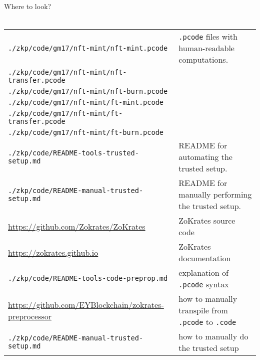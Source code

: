 \begin{center}
  \begin{mdframed}[backgroundcolor=verylightblue]
    Where to look?\\
    \\
    \begin{tabular}{lp{14cm}}
      \texttt{./zkp/code/gm17/nft-mint/nft-mint.pcode} & \texttt{.pcode} files with human-readable computations.\\
      \texttt{./zkp/code/gm17/nft-mint/nft-transfer.pcode} & \\
      \texttt{./zkp/code/gm17/nft-mint/nft-burn.pcode} & \\
      \texttt{./zkp/code/gm17/nft-mint/ft-mint.pcode} & \\
      \texttt{./zkp/code/gm17/nft-mint/ft-transfer.pcode} & \\
      \texttt{./zkp/code/gm17/nft-mint/ft-burn.pcode} & \\
      \texttt{./zkp/code/README-tools-trusted-setup.md} & README for automating the trusted setup.\\
      \texttt{./zkp/code/README-manual-trusted-setup.md} & README for manually performing the trusted setup.\\
      \url{https://github.com/Zokrates/ZoKrates} & ZoKrates source code\\
      \url{https://zokrates.github.io} & ZoKrates documentation\\
      \texttt{./zkp/code/README-tools-code-preprop.md} & explanation of \texttt{.pcode} syntax\\
      \url{https://github.com/EYBlockchain/zokrates-preprocessor} & how to manually transpile from \texttt{.pcode} to \texttt{.code}\\ 
      \texttt{./zkp/code/README-manual-trusted-setup.md} & how to manually do the trusted setup
    \end{tabular}
  \end{mdframed}
\end{center}